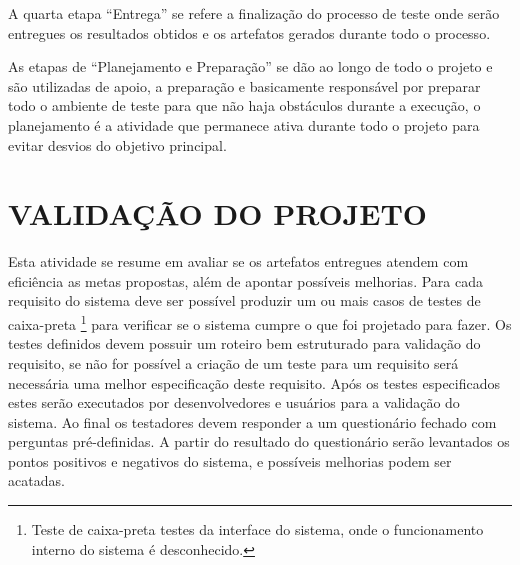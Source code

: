  A quarta etapa “Entrega” se refere a finalização do processo de teste onde serão entregues os resultados obtidos e os artefatos gerados durante todo o processo.
 
 
As etapas de “Planejamento e Preparação” se dão ao longo de todo o projeto e são utilizadas de apoio, a preparação e basicamente responsável por preparar todo o ambiente de teste para que não haja obstáculos durante a execução, o planejamento é a atividade que permanece ativa durante todo o projeto para evitar desvios do objetivo principal.

\section{VALIDAÇÃO DO PROJETO}


Esta atividade se resume em avaliar se os artefatos entregues atendem com eficiência as metas propostas, além de apontar possíveis melhorias. Para cada requisito do sistema deve ser possível produzir um ou mais casos de testes de caixa-preta \footnote{Teste de caixa-preta testes da interface do sistema, onde o funcionamento interno do sistema é desconhecido.} para verificar se o sistema cumpre o que foi projetado para fazer. Os testes definidos devem possuir um roteiro bem estruturado para validação do requisito, se não for possível a criação de um teste para um requisito será necessária uma melhor especificação deste requisito. Após os testes especificados estes serão executados por desenvolvedores e usuários para a validação do sistema. Ao final os testadores devem responder a um questionário fechado com perguntas pré-definidas. A partir do resultado do questionário serão levantados os pontos positivos e negativos do sistema, e possíveis melhorias podem ser acatadas.